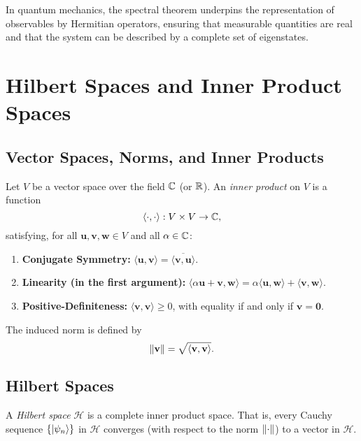 	\begin{remark}
		In quantum mechanics, the spectral theorem underpins the representation of observables by Hermitian operators, ensuring that measurable quantities are real and that the system can be described by a complete set of eigenstates.
	\end{remark}
	
	\chapter{Hilbert Spaces and Inner Product Spaces}
	
	\section{Vector Spaces, Norms, and Inner Products}
	Let \( V \) be a vector space over the field \( \mathbb{C} \) (or \( \mathbb{R} \)). An \emph{inner product} on \( V \) is a function 
	\[
	\langle \cdot , \cdot \rangle : V \times V \to \mathbb{C},
	\]
	satisfying, for all \(\mathbf{u}, \mathbf{v}, \mathbf{w} \in V\) and all \(\alpha \in \mathbb{C}\):
	\begin{enumerate}
		\item \textbf{Conjugate Symmetry:} \(\langle \mathbf{u}, \mathbf{v} \rangle = \overline{\langle \mathbf{v}, \mathbf{u} \rangle}\).
		\item \textbf{Linearity (in the first argument):} \(\langle \alpha \mathbf{u} + \mathbf{v}, \mathbf{w} \rangle = \alpha \langle \mathbf{u}, \mathbf{w} \rangle + \langle \mathbf{v}, \mathbf{w} \rangle\).
		\item \textbf{Positive-Definiteness:} \(\langle \mathbf{v}, \mathbf{v} \rangle \ge 0\), with equality if and only if \(\mathbf{v} = \mathbf{0}\).
	\end{enumerate}
	The induced norm is defined by
	\[
	\left\lVert \mathbf{v} \right\rVert = \sqrt{\langle \mathbf{v}, \mathbf{v} \rangle}.
	\]
	
	\section{Hilbert Spaces}
	\begin{definition}
		A \emph{Hilbert space} \( \mathcal{H} \) is a complete inner product space. That is, every Cauchy sequence \(\{\left| \psi_n \right\rangle\}\) in \(\mathcal{H}\) converges (with respect to the norm \(\left\lVert \cdot \right\rVert\)) to a vector in \(\mathcal{H}\).
	\end{definition}
	
